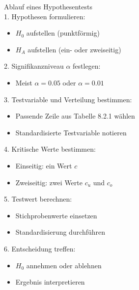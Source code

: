 \begin{KR}{Ablauf eines Hypothesentests}\\
1. Hypothesen formulieren:
   \begin{itemize}
     \item $H_0$ aufstellen (punktförmig)
     \item $H_A$ aufstellen (ein- oder zweiseitig)
   \end{itemize}

2. Signifikanzniveau $\alpha$ festlegen:
   \begin{itemize}
     \item Meist $\alpha = 0.05$ oder $\alpha = 0.01$
   \end{itemize}

3. Testvariable und Verteilung bestimmen:
   \begin{itemize}
     \item Passende Zeile aus Tabelle 8.2.1 wählen
     \item Standardisierte Testvariable notieren
   \end{itemize}

4. Kritische Werte bestimmen:
   \begin{itemize}
     \item Einseitig: ein Wert $c$
     \item Zweiseitig: zwei Werte $c_u$ und $c_o$
   \end{itemize}

5. Testwert berechnen:
   \begin{itemize}
     \item Stichprobenwerte einsetzen
     \item Standardisierung durchführen
   \end{itemize}

6. Entscheidung treffen:
   \begin{itemize}
     \item $H_0$ annehmen oder ablehnen
     \item Ergebnis interpretieren
   \end{itemize}
\end{KR}

